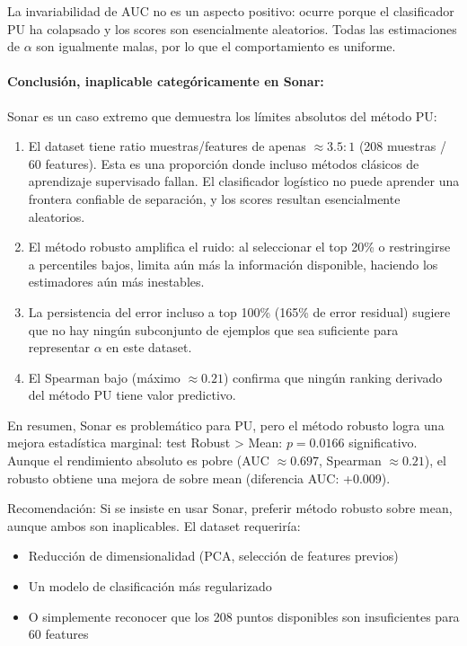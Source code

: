 \documentclass[a4paper,11pt]{article}
\begin{document}
La invariabilidad de AUC no es un aspecto positivo: ocurre porque el clasificador PU ha colapsado y los scores son esencialmente aleatorios. Todas las estimaciones de $\alpha$ son igualmente malas, por lo que el comportamiento es uniforme.

\paragraph{Conclusión, inaplicable categóricamente en Sonar:} Sonar es un caso extremo que demuestra los límites absolutos del método PU:

\begin{enumerate}
    \item El dataset tiene ratio muestras/features de apenas $\approx 3.5:1$ (208 muestras / 60 features). Esta es una proporción donde incluso métodos clásicos de aprendizaje supervisado fallan. El clasificador logístico no puede aprender una frontera confiable de separación, y los scores resultan esencialmente aleatorios.
    \item El método robusto amplifica el ruido: al seleccionar el top 20\% o restringirse a percentiles bajos, limita aún más la información disponible, haciendo los estimadores aún más inestables.
    \item La persistencia del error incluso a top 100\% (165\% de error residual) sugiere que no hay ningún subconjunto de ejemplos que sea suficiente para representar $\alpha$ en este dataset.
    \item El Spearman bajo (máximo $\approx 0.21$) confirma que ningún ranking derivado del método PU tiene valor predictivo.
\end{enumerate}

En resumen, Sonar es problemático para PU, pero el método robusto logra una mejora estadística marginal: test Robust > Mean: $p=0.0166$ significativo. Aunque el rendimiento absoluto es pobre (AUC $\approx 0.697$, Spearman $\approx 0.21$), el robusto obtiene una mejora de sobre mean (diferencia AUC: +0.009).

Recomendación: Si se insiste en usar Sonar, preferir método robusto sobre mean, aunque ambos son inaplicables. El dataset requeriría:

\begin{itemize}
    \item Reducción de dimensionalidad (PCA, selección de features previos)
    \item Un modelo de clasificación más regularizado
    \item O simplemente reconocer que los 208 puntos disponibles son insuficientes para 60 features
\end{itemize}
\end{document}
